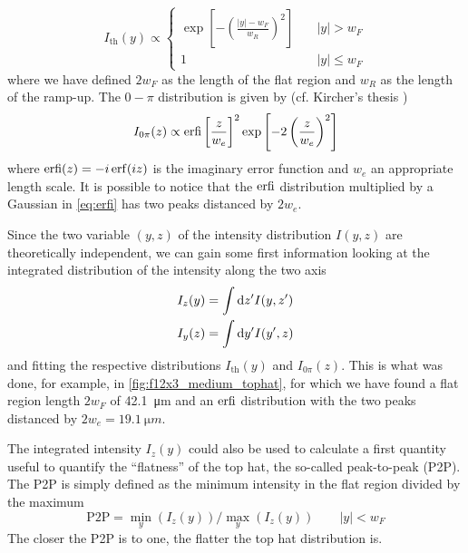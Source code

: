 \begin{equation}
    I_\text{th}(y) \propto
    \begin{cases}
        \exp\left[-\left(\frac{\left|y\right|-w_F}{w_R}\right)^2\right] & \quad |y| > w_F    \\
        1                                                               & \quad |y| \leq w_F
    \end{cases}
\end{equation}
where we have defined $2w_F$ as the length of the flat region and $w_R$ as the length of the ramp-up. The $0-\pi$ distribution is given by (cf. Kircher's thesis \cite{krinner2015})
\begin{equation}
    \label{eq:erfi}
    I_{0\pi}(z) \propto  \text{erfi}\left[\frac{z}{w_e}\right]^2 \exp\left[-2 \left(\frac{z}{w_e}\right)^2\right]
\end{equation}
where $\erfi(z) = -i\erf(iz)$ is the imaginary error function and $w_e$ an appropriate length scale. It is possible to notice that the $\text{erfi}$ distribution multiplied by a Gaussian in \cref{eq:erfi} has two peaks distanced by $2w_e$.

Since the two variable $(y,z)$ of the intensity distribution $I(y,z)$ are theoretically independent, we can gain some first information looking at the integrated distribution of the intensity along the two axis
\begin{align}
    I_z(y) & = \int \differential z' I(y,z') \\
    I_y(z) & = \int \differential y' I(y',z)
\end{align}
and fitting the respective distributions $I_\text{th}(y)$ and $I_{0\pi}(z)$. This is what was done, for example, in \cref{fig:f12x3_medium_tophat}, for which we have found a flat region length $2w_F$ of \SI{42.1}{\micro m} and an $\text{erfi}$ distribution with the two peaks distanced by $2w_e = \SI{19.1}{\micro m}$.

The integrated intensity $I_z(y)$ could also be used to calculate a first quantity useful to quantify the \enquote{flatness} of the top hat, the so-called peak-to-peak (P2P). The P2P is simply defined as the minimum intensity in the flat region divided by the maximum
\begin{equation}
    \label{eq:p2p}
    \text{P2P} = \min_y(I_z(y)) / \max_y(I_z(y)) \qquad |y| < w_F
\end{equation}
The closer the P2P is to one, the flatter the top hat distribution is.

